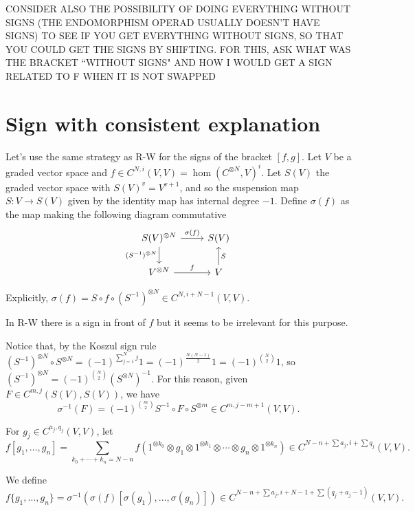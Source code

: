 \documentclass[twoside]{article}
\begin{document}
CONSIDER ALSO THE POSSIBILITY OF DOING EVERYTHING WITHOUT SIGNS (THE ENDOMORPHISM OPERAD USUALLY DOESN'T HAVE SIGNS) TO SEE IF YOU GET EVERYTHING WITHOUT SIGNS, SO THAT YOU COULD GET THE SIGNS BY SHIFTING. FOR THIS, ASK WHAT WAS THE BRACKET ``WITHOUT SIGNS" AND HOW I WOULD GET A SIGN RELATED TO F WHEN IT IS NOT SWAPPED

\section{Sign with consistent explanation}

Let's use the same strategy as R-W for the signs of the bracket $[f,g]$. Let $V$ be a graded vector space and $f\in C^{N,i}(V,V)=\hom(C^{\otimes N},V)^i$. Let $S(V)$ the graded vector space with $S(V)^v=V^{v+1}$, and so the suspension map $S:V\to S(V)$ given by the identity map has internal degree $-1$. Define $\sigma(f)$ as the map making the following diagram commutative
\[
\begin{tikzcd}
S(V)^{\otimes N}\arrow[r, "\sigma(f)"]\arrow[d, "(S^{-1})^{\otimes N}"'] & S(V)\\
V^{\otimes N}\arrow[r,"f"] & V\arrow[u, "S"']
\end{tikzcd}
\]

Explicitly, $\sigma(f)=S\circ f\circ (S^{-1})^{\otimes N}\in C^{N,i+N-1}(V,V)$. 

In R-W there is a sign in front of $f$ but it seems to be irrelevant for this purpose. 

Notice that, by the Koszul sign rule $(S^{-1})^{\otimes N}\circ S^{\otimes N}=(-1)^{\sum_{j=1}^N j}1=(-1)^{\frac{N(N-1)}{2}}1=(-1)^{\binom{N}{2}}1$, so $(S^{-1})^{\otimes N}= (-1)^{\binom{N}{2}}(S^{\otimes N})^{-1}$. For this reason, given $F\in C^{m,j}(S(V),S(V))$, we have
\[
\sigma^{-1}(F)=(-1)^{\binom{m}{2}}S^{-1}\circ F\circ S^{\otimes m}\in C^{m,j-m+1}(V,V).
\]

For $g_j\in C^{a_j,q_j}(V,V)$, let $$f[g_1,\dots, g_n]=\sum_{k_0+\cdots+k_n=N-n}f(1^{\otimes k_0}\otimes g_1\otimes 1^{\otimes k_1}\otimes\cdots\otimes g_n\otimes 1^{\otimes k_n})\in C^{N-n+\sum a_j, i+\sum q_j}(V,V).$$

We define $f\{g_1,\dots, g_n\}=\sigma^{-1}(\sigma(f)[\sigma(g_1),\dots, \sigma(g_n)])\in C^{N-n+\sum a_j, i+N-1+\sum (q_j+a_j-1)}(V,V).$
\end{document}
